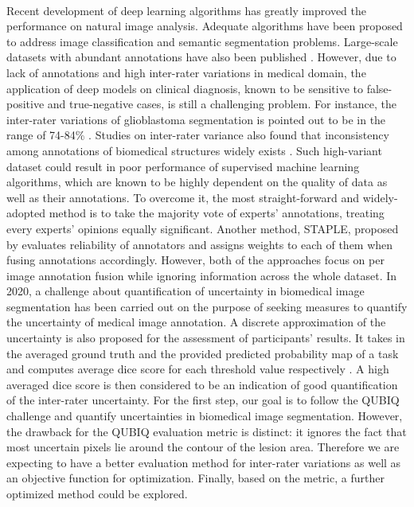 \documentclass[12pt]{extarticle}
\begin{document}
\paragraph{}
Recent development of deep learning algorithms has greatly improved 
the performance on natural image analysis. 
Adequate algorithms have been proposed to address image classification and semantic
segmentation problems. Large-scale datasets with abundant annotations have also been
published \cite{nair_precup_arnold_arbel_2020}.
However, due to
lack of annotations and high inter-rater variations\cite{zhang2020disentangling}
in medical domain, the application of deep models on clinical diagnosis,
known to be sensitive to false-positive and true-negative cases, is still a challenging problem.
For instance, the inter-rater variations of glioblastoma segmentation
is pointed out to be in the range of 74-84\% \cite{6975210}.
Studies on inter-rater variance also found that
inconsistency among annotations of biomedical structures widely exists
\cite{Variability2019}\cite{interobserver2018}. Such high-variant dataset 
could result in poor performance of supervised machine learning algorithms,
which are known to be highly dependent on the quality of data as well as their annotations.
To overcome it, the most straight-forward and widely-adopted method 
is to take the majority vote of experts' annotations, treating every 
experts' opinions equally significant\cite{6975210}. Another method, STAPLE, proposed by \cite{STAPLE} 
evaluates reliability of annotators and assigns weights to each of them when 
fusing annotations accordingly. However, both of the approaches focus on per image annotation fusion
while ignoring information across the whole dataset\cite{zhang2020disentangling}.
In 2020, a challenge about quantification of uncertainty 
in biomedical image segmentation has been carried
out on the purpose of seeking measures to quantify the uncertainty of 
medical image annotation. A discrete approximation of the uncertainty is also
proposed for the assessment of participants' results. It
takes in the averaged ground truth and the provided predicted probability map of a task
and computes average dice score for each threshold value respectively 
\cite{qubiq}. 
A high averaged dice score is then considered to be an indication of 
good quantification of the inter-rater uncertainty.
For the first step, our goal is to follow the QUBIQ challenge and quantify 
uncertainties in biomedical image segmentation. 
However, the drawback for the QUBIQ evaluation metric is distinct: it 
ignores the fact that most uncertain pixels lie around 
the contour of the lesion area. Therefore we are expecting to have a
better evaluation method for inter-rater variations as well as an objective function for 
optimization. Finally, based on the metric, a further
optimized method could be explored.
\end{document}
